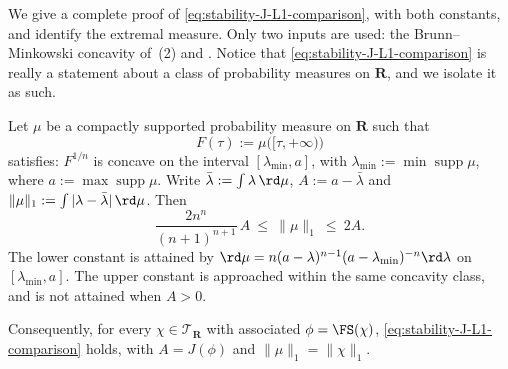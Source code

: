 We give a complete proof of \eqref{eq:stability-J-L1-comparison}, with
both constants, and identify the extremal measure.  Only two inputs are
used: the Brunn--Minkowski concavity of
\,(2) and
.  Notice that
\eqref{eq:stability-J-L1-comparison} is really a statement about a class of
probability measures on $\mathbf R$, and we isolate it as such.

\begin{theorem}
\label{thm:ch50-J-L1}
Let $\mu$ be a compactly supported probability measure on $\mathbf R$
such that
\[
 F(\tau):=\mu\bigl([\tau,+\infty)\bigr)
\]
satisfies: $F^{1/n}$ is concave on the interval
$[\lambda_{\min},a]$, with $\lambda_{\min}:=\min\operatorname{supp}\mu$, where
$a:=\max\operatorname{supp}\mu$.  Write
$\bar\lambda:=\int\lambda\,\rd\mu$, $A:=a-\bar\lambda$ and
$\|\mu\|_1:=\int|\lambda-\bar\lambda|\,\rd\mu$.  Then
\[
 \frac{2n^n}{(n+1)^{n+1}}\,A\ \le\ \|\mu\|_1\ \le\ 2A .
\tag{50.35}\label{eq:ch50-J-L1-abstract}
\]
The lower constant is attained by
$\rd\mu=n(a-\lambda)^{n-1}(a-\lambda_{\min})^{-n}\rd\lambda$
on $[\lambda_{\min},a]$.  The upper constant is approached within the
same concavity class, and is not attained when $A>0$.

Consequently, for every $\chi\in\mathcal T_{\mathbf R}$ with associated
$\phi=\FS(\chi)$,
\eqref{eq:stability-J-L1-comparison} holds, with $A=J(\phi)$ and
$\|\mu\|_1=\|\chi\|_1$.
\end{theorem}

